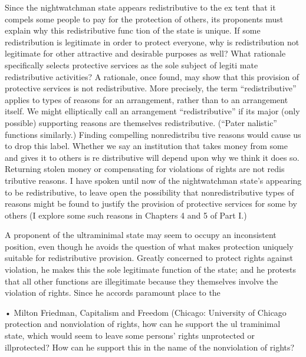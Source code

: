 \documentclass[11pt,openany]{book}
\begin{document}
Since the nightwatchman state appears redistributive to the ex tent that it compels some people to pay for the protection of others, its proponents must explain why this redistributive func tion of the state is unique. If some redistribution is legitimate in order to protect everyone, why is redistribution not legitimate for other attractive and desirable purposes as well? What rationale specifically selects protective services as the sole subject of legiti mate redistributive activities? A rationale, once found, may show that this provision of protective services is not redistributive. More precisely, the term ``redistributive'' applies to types of reasons for an arrangement, rather than to an arrangement itself. We might elliptically call an arrangement ``redistributive'' if its major (only possible) supporting reasons are themselves redistributive. (``Pater nalistic'' functions similarly.) Finding compelling nonredistribu tive reasons would cause us to drop this label. Whether we say an institution that takes money from some and gives it to others is re distributive will depend upon why we think it does so. Returning stolen money or compensating for violations of rights are not redis tributive reasons. I have spoken until now of the nightwatchman state's appearing to be redistributive, to leave open the possibility that nonredistributive types of reasons might be found to justify the provision of protective services for some by others (I explore some such reasons in Chapters 4 and 5 of Part I.) 

A proponent of the ultraminimal state may seem to occupy an inconsistent position, even though he avoids the question of what makes protection uniquely suitable for redistributive provision. Greatly concerned to protect rights against violation, he makes this the sole legitimate function of the state; and he protests that all other functions are illegitimate because they themselves involve the violation of rights. Since he accords paramount place to the 

• Milton Friedman, Capitalism and Freedom (Chicago: University of Chicago protection and nonviolation of rights, how can he support the ul traminimal state, which would seem to leave some persons' rights unprotected or illprotected? How can he support this in the name of the nonviolation of rights? 
\end{document}
